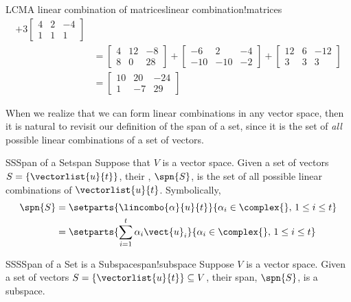 \begin{example}{LCM}{A linear combination of matrices}{linear combination!matrices}
\begin{align*}
+3
\begin{bmatrix}
4&2&-4\\
1&1&1
\end{bmatrix}\\
&=
\begin{bmatrix}
4&12&-8\\
8&0&28
\end{bmatrix}
+
\begin{bmatrix}
-6&2&-4\\
-10&-10&-2
\end{bmatrix}
+
\begin{bmatrix}
12&6&-12\\
3&3&3
\end{bmatrix}\\
&=
\begin{bmatrix}
10&20&-24\\
1&-7&29
\end{bmatrix}
%
\end{align*}
%
\end{example}
%
When we realize that we can form linear combinations in any vector space, then it is natural to revisit our definition of the span of a set, since it is the set of {\em all} possible linear combinations of a set of vectors.
%
\begin{definition}{SS}{Span of a Set}{span}
Suppose that $V$ is a vector space.
Given a set of vectors $S=\{\vectorlist{u}{t}\}$, their , $\spn{S}$, is the set of all possible linear combinations of $\vectorlist{u}{t}$.  Symbolically,
%
\begin{align*}
\spn{S}&=\setparts{\lincombo{\alpha}{u}{t}}{\alpha_i\in\complex{\null},\,1\leq i\leq t}\\
&=\setparts{\sum_{i=1}^{t}\alpha_i\vect{u}_i}{\alpha_i\in\complex{\null},\,1\leq i\leq t}
\end{align*}
%
\end{definition}
%
\begin{theorem}{SSS}{Span of a Set is a Subspace}{span!subspace}
Suppose $V$ is a vector space.  Given a set of vectors $S=\{\vectorlist{u}{t}\}\subseteq V$, their span, $\spn{S}$, is a subspace.
\end{theorem}
%
